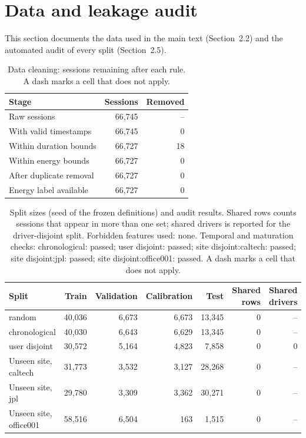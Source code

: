 \section{Data and leakage audit}
This section documents the data used in the main text (Section~2.2) and the automated audit of every split (Section~2.5).
\begin{table}[H]\centering\small
\caption{Data cleaning: sessions remaining after each rule. A dash marks a cell that does not apply.}\label{tab:s-flow}
\begin{tabular}{lrr}\toprule
Stage & Sessions & Removed \\\midrule
Raw sessions & 66,745 & -- \\
With valid timestamps & 66,745 & 0 \\
Within duration bounds & 66,727 & 18 \\
Within energy bounds & 66,727 & 0 \\
After duplicate removal & 66,727 & 0 \\
Energy label available & 66,727 & 0 \\
\bottomrule\end{tabular}\end{table}

\begin{table}[H]\centering\footnotesize
\caption{Split sizes (seed of the frozen definitions) and audit results. Shared rows counts sessions that appear in more than one set; shared drivers is reported for the driver-disjoint split. Forbidden features used: none. Temporal and maturation checks: chronological: passed; user disjoint: passed; site disjoint:caltech: passed; site disjoint:jpl: passed; site disjoint:office001: passed. A dash marks a cell that does not apply.}\label{tab:s-audit}
\begin{tabular}{lrrrrrr}\toprule
Split & Train & Validation & Calibration & Test & Shared rows & Shared drivers \\\midrule
random & 40,036 & 6,673 & 6,673 & 13,345 & 0 & -- \\
chronological & 40,030 & 6,643 & 6,629 & 13,345 & 0 & -- \\
user disjoint & 30,572 & 5,164 & 4,823 & 7,858 & 0 & 0 \\
Unseen site, caltech & 31,773 & 3,532 & 3,127 & 28,268 & 0 & -- \\
Unseen site, jpl & 29,780 & 3,309 & 3,362 & 30,271 & 0 & -- \\
Unseen site, office001 & 58,516 & 6,504 & 163 & 1,515 & 0 & -- \\
\bottomrule\end{tabular}\end{table}

